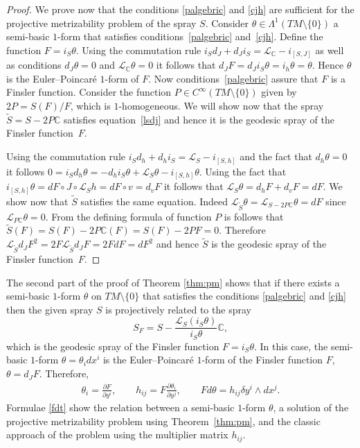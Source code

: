 \documentclass[11pt]{article}
\numberwithin{equation}{section}
\begin{document}
\begin{proof}
We prove now that the conditions \eqref{palgebric} and \eqref{cjh}  are
suf\/f\/icient for the projective metrizability problem of the spray $S$. Consider $\theta\in \Lambda^1(TM\setminus\{0\})$
a semi-basic $1$-form that sa\-tis\-f\/ies conditions~\eqref{palgebric}
and~\eqref{cjh}. Def\/ine the function $F=i_S\theta$. Using the commutation rule
$i_Sd_J+d_Ji_S=\mathcal{L}_{\mathbb{C}}-i_{[S,J]}$ as well as
conditions $d_J\theta=0$ and $\mathcal{L}_{\mathbb{C}}\theta=0$ it
follows that $d_JF=d_Ji_S\theta=i_h\theta=\theta$. Hence $\theta$
is the Euler--Poincar\'e $1$-form of $F$. Now conditions~\eqref{palgebric} assure that $F$ is a Finsler function. Consider
the function $P\in C^{\infty}(TM\setminus\{0\})$ given by
$2P=S(F)/F$, which is $1$-homogeneous. We will show now that the
spray $\tilde{S}=S-2P\mathbb{C}$ satisf\/ies equation~\eqref{lsdj}
and hence it is the geodesic spray of the Finsler function~$F$.

Using the commutation rule $i_Sd_h+d_hi_S=\mathcal{L}_S-
i_{[S,h]}$ and the fact that $d_h\theta=0$ it follows
$0=i_Sd_h\theta=-d_hi_S\theta+ \mathcal{L}_S\theta-
i_{[S,h]}\theta$. Using the fact that $i_{[S,h]}\theta=dF\circ
J\circ \mathcal{L}_Sh=dF\circ v=d_vF$ it follows that
$\mathcal{L}_S\theta=d_hF+d_vF=dF$. We show now that $\tilde{S}$
satisf\/ies the same equation. Indeed
$\mathcal{L}_{\tilde{S}}\theta=
\mathcal{L}_{S-2P\mathbb{C}}\theta=dF$ since
$\mathcal{L}_{P\mathbb{C}}\theta=0$. From the def\/ining formula of
function $P$ is follows that
$\tilde{S}(F)=S(F)-2P\mathbb{C}(F)=S(F)-2PF=0$. Therefore
$\mathcal{L}_{\tilde{S}}d_JF^2=2F\mathcal{L}_{\tilde{S}}d_JF=2FdF=dF^2$
and hence $\tilde{S}$ is the geodesic spray of the Finsler
function~$F$.
\end{proof}

The second part of the proof of Theorem \ref{thm:pm} shows that if
there exists a semi-basic $1$-form $\theta$ on $TM\setminus\{0\}$ that
satisf\/ies the conditions \eqref{palgebric} and \eqref{cjh} then the
given spray $S$ is projectively related to the spray
\[
 S_F=S-\frac{\mathcal{L}_{S}(i_S\theta)}{i_S\theta}\mathbb{C},
 \]
  which is
the geodesic spray of the Finsler function $F=i_S\theta$. In this
case, the semi-basic $1$-form $\theta=\theta_i dx^i$ is the
Euler--Poincar\'e $1$-form of the Finsler function $F$,
$\theta=d_JF$. Therefore,
\begin{gather} \theta_i=\frac{\partial F}{\partial y^i}, \qquad
  h_{ij}=F\frac{\partial \theta_i}{\partial
    y^j}, \qquad Fd\theta=h_{ij} \delta y^i \wedge
  dx^j. \label{fdt} \end{gather}
Formulae \eqref{fdt} show the relation between a semi-basic $1$-form
$\theta$, a solution of the projective metrizability problem using
Theorem~\ref{thm:pm}, and the classic approach of the problem using the
multiplier matrix $h_{ij}$.
\end{document}
